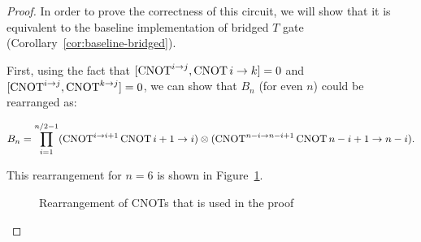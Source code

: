 \begin{proof}
  In order to prove the correctness of this circuit, we will show that it is equivalent to the baseline implementation of bridged $T$ gate (Corollary~\ref{cor:baseline-bridged}).
  
  First, using the fact that $[\operatorname{CNOT}^{i \to j}, \operatorname{CNOT}{i \to k}] = 0$ and $[\operatorname{CNOT}^{i \to j}, \operatorname{CNOT}^{k \to j}] = 0$, we can show that $B_n$ (for even $n$) could be rearranged as:

  \begin{equation}
    B_n = \prod_{i=1}^{n/2 - 1} (\operatorname{CNOT}^{i\to i+1}\operatorname{CNOT}{i+1\to i}) \otimes (\operatorname{CNOT}^{n-i\to n-i+1} \operatorname{CNOT}{n-i+1\to n-i}).
  \end{equation}

  This rearrangement for $n = 6$ is shown in Figure~\ref{fig:bridged-class-i-proof-a}.

  \begin{figure}[h!]
    \label{fig:bridged-class-i-proof-a}
    \centering
    \caption{Rearrangement of CNOTs that is used in the proof}
  \end{figure}


\end{proof}
